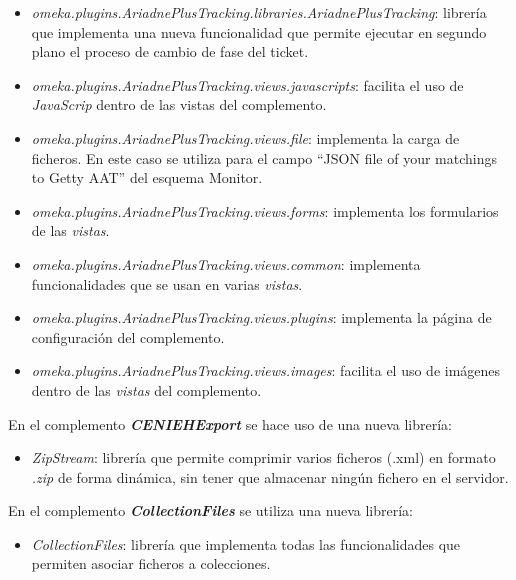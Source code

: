 \begin{itemize}
\tightlist
\item
  \emph{omeka.plugins.AriadnePlusTracking.libraries.AriadnePlusTracking}:
  librería que implementa una nueva funcionalidad que permite ejecutar
  en segundo plano el proceso de cambio de fase del ticket.
\item
  \emph{omeka.plugins.AriadnePlusTracking.views.javascripts}: facilita
  el uso de \emph{JavaScrip} dentro de las vistas del complemento.
\item
  \emph{omeka.plugins.AriadnePlusTracking.views.file}: implementa la
  carga de ficheros. En este caso se utiliza para el campo ``JSON file of
  your matchings to Getty AAT'' del esquema Monitor.
\item
  \emph{omeka.plugins.AriadnePlusTracking.views.forms}: implementa los
  formularios de las \emph{vistas}.
\item
  \emph{omeka.plugins.AriadnePlusTracking.views.common}: implementa
  funcionalidades que se usan en varias \emph{vistas}.
\item
  \emph{omeka.plugins.AriadnePlusTracking.views.plugins}: implementa la
  página de configuración del complemento.
\item
  \emph{omeka.plugins.AriadnePlusTracking.views.images}: facilita el uso
  de imágenes dentro de las \emph{vistas} del complemento.
\end{itemize}


En el complemento \textbf{\emph{CENIEHExport}} se hace uso de una nueva librería:

\begin{itemize}
\tightlist
\item
  \emph{ZipStream}: librería que permite comprimir varios ficheros
  (.xml) en formato \emph{.zip} de forma dinámica, sin tener que
  almacenar ningún fichero en el servidor.
\end{itemize}


En el complemento \textbf{\emph{CollectionFiles}} se utiliza una nueva librería:

\begin{itemize}
\tightlist
\item
  \emph{CollectionFiles}: librería que implementa todas las
  funcionalidades que permiten asociar ficheros a colecciones.
\end{itemize}

